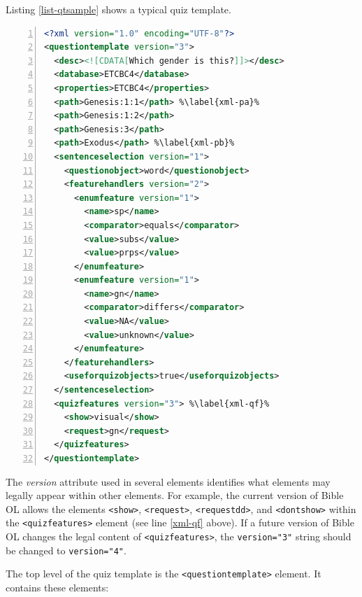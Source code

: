\documentclass[11pt,oneside,a4paper]{memoir}
\newcommand*{\xml}[1]{\texttt{<#1>}}
\newcommand*{\xmla}[1]{\texttt{#1}} %
\begin{document}
Listing \ref{list-qtsample} shows a typical quiz template.

\begin{lstlisting}[language=XML,numbers=left,caption=Quiz template sample,label=list-qtsample]
<?xml version="1.0" encoding="UTF-8"?>
<questiontemplate version="3">
  <desc><![CDATA[Which gender is this?]]></desc>
  <database>ETCBC4</database>
  <properties>ETCBC4</properties>
  <path>Genesis:1:1</path> %\label{xml-pa}%
  <path>Genesis:1:2</path>
  <path>Genesis:3</path>
  <path>Exodus</path> %\label{xml-pb}%
  <sentenceselection version="1">
    <questionobject>word</questionobject>
    <featurehandlers version="2">
      <enumfeature version="1">
        <name>sp</name>
        <comparator>equals</comparator>
        <value>subs</value>
        <value>prps</value>
      </enumfeature>
      <enumfeature version="1">
        <name>gn</name>
        <comparator>differs</comparator>
        <value>NA</value>
        <value>unknown</value>
      </enumfeature>
    </featurehandlers>
    <useforquizobjects>true</useforquizobjects>
  </sentenceselection>
  <quizfeatures version="3"> %\label{xml-qf}%
    <show>visual</show>
    <request>gn</request>
  </quizfeatures>
</questiontemplate>
\end{lstlisting}

The \emph{version} attribute used in several elements identifies what elements may legally appear
within other elements. For example, the current version of Bible OL allows the elements \xml{show},
\xml{request}, \xml{requestdd}, and \xml{dontshow} within the \xml{quizfeatures} element (see line
\ref{xml-qf} above). If a future version of Bible OL changes the legal content of
\xml{quizfeatures}, the \xmla{version="3"} string should be changed to \xmla{version="4"}.


The top level of the quiz template is the \xml{questiontemplate} element. It contains these
elements:
\end{document}
